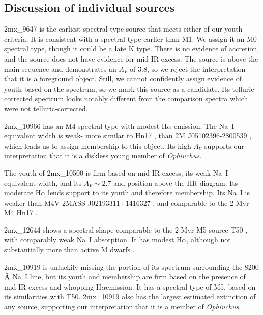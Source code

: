 %	

\subsection{Discussion of individual sources}
\label{sec_individual_sources}
2mx\_9647 is the earliest spectral type source that meets either of our youth criteria.  It is consistent with a spectral type earlier than M1.  We assign it an M0 spectral type, though it could be a late K type.  There is no evidence of accretion, and the source does not have evidence for mid-IR excess.  The source is above the main sequence and demonstrates an $A_V$ of 3.8, so we reject the interpretation that it is a foreground object.  Still, we cannot confidently assign evidence of youth based on the spectrum, so we mark this source as a candidate.  Its telluric-corrected spectrum looks notably different from the comparison spectra which were not telluric-corrected.  

2mx\_10966 has an M4 spectral type with modest H$\alpha$ emission.  The Na~I equivalent width is weak- more similar to Hn17 \citep{2004ApJ...602..816L}, than 2M J05102396-2800539 \citep{2007AJ....133..439C}, which leads us to assign membership to this object.  Its high $A_V$ supports our interpretation that it is a diskless young member of \emph{Ophiuchus}.

The youth of 2mx\_10500 is firm based on mid-IR excess, its weak Na~I equivalent width, and its $A_V\sim2.7$ and position above the HR diagram.  Its moderate H$\alpha$ lends support to its youth and therefore membership.  Its Na~I is weaker than M4V 2MASS J02193311+1416327 \citep{2003AJ....126.2421C}, and comparable to the 2 Myr M4 Hn17 \citep{2004ApJ...602..816L}.

2mx\_12644 shows a spectral shape comparable to the 2 Myr M5 source T50 \citep{2004ApJ...602..816L}, with comparably weak Na~I absorption.  It has modest H$\alpha$, although not substantially more than active M dwarfs \citep{2011AJ....141...97W}.  

2mx\_10919 is unluckily missing the portion of its spectrum surrounding the 8200 $\mbox{\normalfont\AA}$ Na~I line, but its youth and membership are firm based on the presence of mid-IR excess and whopping H$\alpha$emission.  It has a spectral type of M5, based on its similarities with T50.  2mx\_10919 also has the largest estimated extinction of any source, supporting our interpretation that it is a member of \emph{Ophiuchus}.

